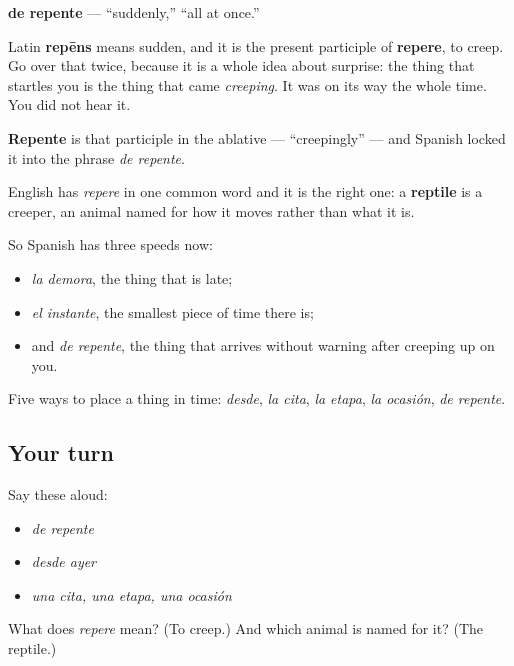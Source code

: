 \begin{cousinweb}
\textbf{de repente} — \textquotedblleft{}suddenly,\textquotedblright{} \textquotedblleft{}all at once.\textquotedblright{}

Latin \textbf{repēns} means sudden, and it is the present participle of \textbf{repere}, to creep. Go over that twice, because it is a whole idea about surprise: the thing that startles you is the thing that came \emph{creeping}. It was on its way the whole time. You did not hear it.

\textbf{Repente} is that participle in the ablative — \textquotedblleft{}creepingly\textquotedblright{} — and Spanish locked it into the phrase \emph{de repente}.

English has \emph{repere} in one common word and it is the right one: a \textbf{reptile} is a creeper, an animal named for how it moves rather than what it is.

So Spanish has three speeds now:

\begin{itemize}
\raggedright
  \item \emph{la demora}, the thing that is late;
  \item \emph{el instante}, the smallest piece of time there is;
  \item and \emph{de repente}, the thing that arrives without warning after creeping up on you.
\end{itemize}
\end{cousinweb}

\begin{grammarlens}[title={What you've built}]
Five ways to place a thing in time: \emph{desde}, \emph{la cita}, \emph{la etapa}, \emph{la ocasión}, \emph{de repente}.
\end{grammarlens}

\subsection*{Your turn}
Say these aloud:

\begin{itemize}
\raggedright
  \item \emph{de repente}
  \item \emph{desde ayer}
  \item \emph{una cita, una etapa, una ocasión}
\end{itemize}

\begin{tcolorbox}[breakable,colback=teal!4,colframe=teal!35!black,title={Before you move on}]
What does \emph{repere} mean? (To creep.) And which animal is named for it? (The reptile.)
\end{tcolorbox}
